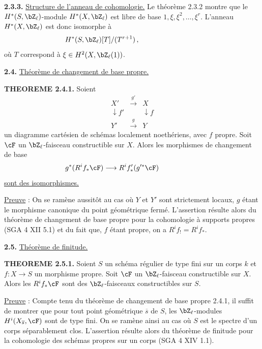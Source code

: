\smallskip

\noindent
\textbf{2.3.3.} \underline{Structure de l'anneau de cohomologie.} Le th\'eor\`eme 2.3.2 montre que le $H^*(S, \bZ_{\ell})$-module $H^*(X, \bZ_{\ell})$ est libre de base $1, \xi, \xi^2, \ldots, \xi^r$. L'anneau $H^*(X, \bZ_{\ell})$ est donc isomorphe \`a
\[
H^*(S, \bZ_{\ell})[T]/(T^{r+1})\,,\hspace*{3cm}
\]
o\`u $T$ correspond \`a $\xi \in H^2(X, \bZ_{\ell}(1))$.

\newpage

\noindent
\textbf{2.4.} \underline{Th\'eor\`eme de changement de base propre.}

\noindent
\textbf{THEOREME 2.4.1.} Soient
\[
\begin{array}{ccc}
X' & \xrightarrow{\;g'\;} & X \\
\downarrow{f'} & & \downarrow{f} \\
Y' & \xrightarrow{\;g\;} & Y
\end{array}
\]
un diagramme cart\'esien de sch\'emas localement noeth\'eriens, avec $f$ propre. Soit $\cF$ un $\bZ_{\ell}$-faisceau constructible sur $X$. Alors les morphismes de changement de base
\[
g^*(R^i f_* \cF) \longrightarrow R^i f'_*(g'^* \cF)\hspace*{2cm}
\]
\underline{sont des isomorphismes.}

\smallskip

\noindent
\underline{Preuve} : On se ram\`ene aussit\^ot au cas o\`u $Y$ et $Y'$ sont strictement locaux, $g$ \'etant le morphisme canonique du point g\'eom\'etrique ferm\'e. L'assertion r\'esulte alors du th\'eor\`eme de changement de base propre pour la cohomologie \`a supports propres (SGA 4 XII 5.1) et du fait que, $f$ \'etant propre, on a $R^i f_! = R^i f_*$.

\bigskip

\noindent
\textbf{2.5.} \underline{Th\'eor\`eme de finitude.}

\noindent
\textbf{THEOREME 2.5.1.} Soient $S$ un sch\'ema r\'egulier de type fini sur un corps $k$ et $f : X \rightarrow S$ un morphisme propre. Soit $\cF$ un $\bZ_{\ell}$-faisceau constructible sur $X$. Alors les $R^i f_* \cF$ sont des $\bZ_{\ell}$-faisceaux constructibles sur $S$.

\smallskip

\noindent
\underline{Preuve} : Compte tenu du th\'eor\`eme de changement de base propre 2.4.1, il suffit de montrer que pour tout point g\'eom\'etrique $\overline{s}$ de $S$, les $\bZ_{\ell}$-modules $H^i(X_{\overline{s}}, \cF)$ sont de type fini. On se ram\`ene ainsi au cas o\`u $S$ est le spectre d'un corps s\'eparablement clos. L'assertion r\'esulte alors du th\'eor\`eme de finitude pour la cohomologie des sch\'emas propres sur un corps (SGA 4 XIV 1.1).

